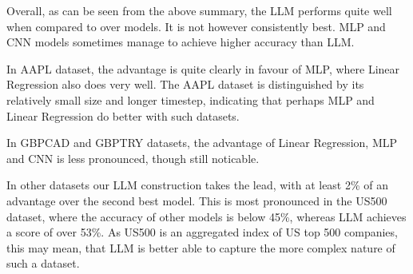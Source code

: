 Overall, as can be seen from the above summary, the LLM performs quite well when compared to over models. It is not however consistently best. MLP and CNN models sometimes manage to achieve higher accuracy than LLM.

In AAPL dataset, the advantage is quite clearly in favour of MLP, where Linear Regression also does very well. The AAPL dataset is distinguished by its relatively small size and longer timestep, indicating that perhaps MLP and Linear Regression do better with such datasets.

In GBPCAD and GBPTRY datasets, the advantage of Linear Regression, MLP and CNN is less pronounced, though still noticable.

In other datasets our LLM construction takes the lead, with at least 2\% of an advantage over the second best model. This is most pronounced in the US500 dataset, where the accuracy of other models is below 45\%, whereas LLM achieves a score of over 53\%. As US500 is an aggregated index of US top 500 companies, this may mean, that LLM is better able to capture the more complex nature of such a dataset.


